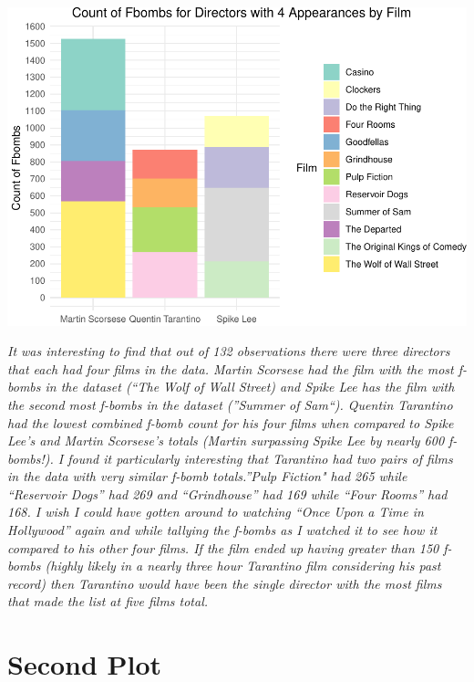 \documentclass[]{article}
\begin{document}
\begin{center}\includegraphics{project1.ethanpieniazekweb_files/figure-latex/unnamed-chunk-14-1} \end{center}

\emph{It was interesting to find that out of 132 observations there were
three directors that each had four films in the data. Martin Scorsese
had the film with the most f-bombs in the dataset (``The Wolf of Wall
Street) and Spike Lee has the film with the second most f-bombs in the
dataset (''Summer of Sam``). Quentin Tarantino had the lowest combined
f-bomb count for his four films when compared to Spike Lee's and Martin
Scorsese's totals (Martin surpassing Spike Lee by nearly 600 f-bombs!).
I found it particularly interesting that Tarantino had two pairs of
films in the data with very similar f-bomb totals.''Pulp Fiction" had
265 while ``Reservoir Dogs'' had 269 and ``Grindhouse'' had 169 while
``Four Rooms'' had 168. I wish I could have gotten around to watching
``Once Upon a Time in Hollywood'' again and while tallying the f-bombs
as I watched it to see how it compared to his other four films. If the
film ended up having greater than 150 f-bombs (highly likely in a nearly
three hour Tarantino film considering his past record) then Tarantino
would have been the single director with the most films that made the
list at five films total.}

\hypertarget{second-plot}{%
\section{Second Plot}\label{second-plot}}
\end{document}
